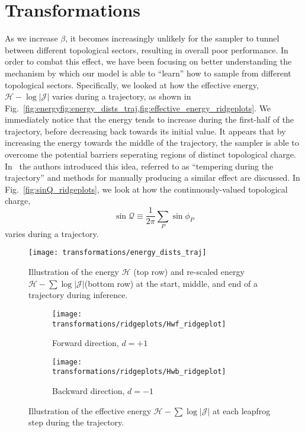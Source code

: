 %
\section{Transformations}
\label{sec:transformations}
%
As we increase \(\beta\), it becomes increasingly unlikely for the sampler to
tunnel between different topological sectors, resulting in overall poor
performance.
%
In order to combat this effect, we have been focusing on better understanding
the mechanism by which our model is able to ``learn'' how to sample from
different topological sectors.
%
Specifically, we looked at how the effective energy, \(\mathcal{H} -
\log|\mathcal{J}|\) varies during a trajectory, as shown in
Fig.~\ref{fig:energyfig:energy_dists_traj,fig:effective_energy_ridgeplots}.
%
We immediately notice that the energy tends to increase during the first-half
of the trajectory, before decreasing back towards its initial value.
%
It appears that by increasing the energy towards the middle of the trajectory,
the sampler is able to overcome the potential barriers seperating regions of
distinct topological charge.
%
In~\cite{Neal_2012} the authors introduced this idea, referred to as
``tempering during the trajectory'' and methods for manually producing a
similar effect are discussed.
%
In Fig.~\ref{fig:sinQ_ridgeplots}, we look at how the continuously-valued
topological charge,
%
\begin{equation}
  \sin\mathcal{Q} \equiv \frac{1}{2\pi}\sum_{P}\sin{\phi_{P}}
\end{equation}
%
varies during a trajectory.
%
%
\begin{figure}[htpb]
  \centering
  \texttt{[image: transformations/energy\_dists\_traj]}
  \caption{Illustration of the energy \(\mathcal{H}\) (top row) and re-scaled
    energy \(\mathcal{H} - \sum{\log|\mathcal{J}|}\)(bottom row) at the
  start, middle, and end of a trajectory during inference.}%
  \label{fig:energy_dists_traj}
\end{figure}
%
\begin{figure}[htpb]
  \centering
  \begin{subfigure}{0.48\textwidth}
    \texttt{[image: transformations/ridgeplots/Hwf\_ridgeplot]}
    \caption{Forward direction, \(d = +1\)}
  \end{subfigure}
  \begin{subfigure}{0.48\textwidth}
    \texttt{[image: transformations/ridgeplots/Hwb\_ridgeplot]}
    \caption{Backward direction, \(d = -1\)}
  \end{subfigure}
    \caption{Illustration of the effective energy \(\mathcal{H} -
    \sum{\log|\mathcal{J}|}\) at each leapfrog step during the trajectory.}%
    \label{fig:effective_energy_ridgeplots}
\end{figure}
